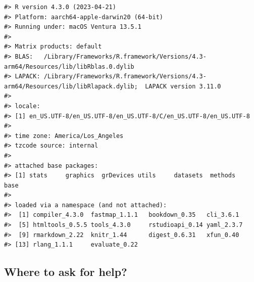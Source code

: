 \documentclass[
]{book}
\begin{document}
\begin{verbatim}
#> R version 4.3.0 (2023-04-21)
#> Platform: aarch64-apple-darwin20 (64-bit)
#> Running under: macOS Ventura 13.5.1
#> 
#> Matrix products: default
#> BLAS:   /Library/Frameworks/R.framework/Versions/4.3-arm64/Resources/lib/libRblas.0.dylib 
#> LAPACK: /Library/Frameworks/R.framework/Versions/4.3-arm64/Resources/lib/libRlapack.dylib;  LAPACK version 3.11.0
#> 
#> locale:
#> [1] en_US.UTF-8/en_US.UTF-8/en_US.UTF-8/C/en_US.UTF-8/en_US.UTF-8
#> 
#> time zone: America/Los_Angeles
#> tzcode source: internal
#> 
#> attached base packages:
#> [1] stats     graphics  grDevices utils     datasets  methods   base     
#> 
#> loaded via a namespace (and not attached):
#>  [1] compiler_4.3.0  fastmap_1.1.1   bookdown_0.35   cli_3.6.1      
#>  [5] htmltools_0.5.5 tools_4.3.0     rstudioapi_0.14 yaml_2.3.7     
#>  [9] rmarkdown_2.22  knitr_1.44      digest_0.6.31   xfun_0.40      
#> [13] rlang_1.1.1     evaluate_0.22
\end{verbatim}

\hypertarget{where-to-ask-for-help}{%
\subsection{Where to ask for help?}\label{where-to-ask-for-help}}
\end{document}
